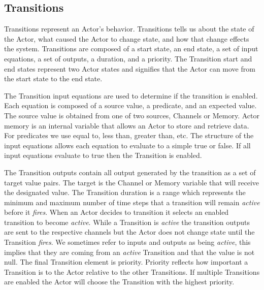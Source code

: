 \subsection{Transitions}
Transitions represent an Actor's behavior.  Transitions tells us about the state of the Actor, what caused the Actor to change state, and how that change effects the system.  Transitions are composed of a start state, an end state, a set of input equations, a set of outputs, a duration, and a priority.  The Transition start and end states represent two Actor states and signifies that the Actor can move from the start state to the end state.  

The Transition input equations are used to determine if the transition is enabled.  Each equation is composed of a source value, a predicate, and an expected value.  The source value is obtained from one of two sources, Channels or Memory.  Actor memory is an internal variable that allows an Actor to store and retrieve data.  For predicates we use equal to, less than, greater than, etc.  The structure of the input equations allows each equation to evaluate to a simple true or false.  If all input equations evaluate to true then the Transition is enabled.  

The Transition outputs contain all output generated by the transition as a set of target value pairs.  The target is the Channel or Memory variable that will receive the designated value.  The Transition duration is a range which represents the minimum and maximum number of time steps that a transition will remain {\em active} before it {\em fires}.  When an Actor decides to transition it selects an enabled transition to become {\em active}.  While a Transition is {\em active} the transition outputs are sent to the respective channels but the Actor does not change state until the Transition {\em fires}.  We sometimes refer to inputs and outputs as being {\em active}, this implies that they are coming from an {\em active} Transition and that the value is not null.  The final Transition element is priority.  Priority reflects how important a Transition is to the Actor relative to the other Transitions.  If multiple Transitions are enabled the Actor will choose the Transition with the highest priority.

